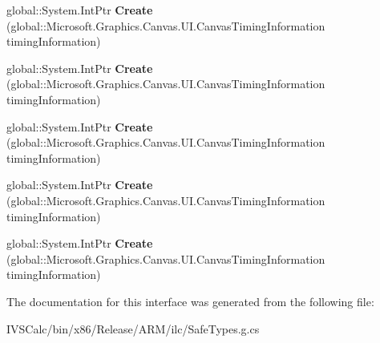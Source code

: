 \begin{DoxyCompactItemize}
\item 
\mbox{\label{interface_microsoft_1_1_graphics_1_1_canvas_1_1_u_i_1_1_xaml_1_1_i_canvas_animated_update_event_args_factory_a43b7b345f4a3e1e7a710d119ac5c47ae}} 
global\+::\+System.\+Int\+Ptr {\bfseries Create} (global\+::\+Microsoft.\+Graphics.\+Canvas.\+U\+I.\+Canvas\+Timing\+Information timing\+Information)
\item 
\mbox{\label{interface_microsoft_1_1_graphics_1_1_canvas_1_1_u_i_1_1_xaml_1_1_i_canvas_animated_update_event_args_factory_a43b7b345f4a3e1e7a710d119ac5c47ae}} 
global\+::\+System.\+Int\+Ptr {\bfseries Create} (global\+::\+Microsoft.\+Graphics.\+Canvas.\+U\+I.\+Canvas\+Timing\+Information timing\+Information)
\item 
\mbox{\label{interface_microsoft_1_1_graphics_1_1_canvas_1_1_u_i_1_1_xaml_1_1_i_canvas_animated_update_event_args_factory_a43b7b345f4a3e1e7a710d119ac5c47ae}} 
global\+::\+System.\+Int\+Ptr {\bfseries Create} (global\+::\+Microsoft.\+Graphics.\+Canvas.\+U\+I.\+Canvas\+Timing\+Information timing\+Information)
\item 
\mbox{\label{interface_microsoft_1_1_graphics_1_1_canvas_1_1_u_i_1_1_xaml_1_1_i_canvas_animated_update_event_args_factory_a43b7b345f4a3e1e7a710d119ac5c47ae}} 
global\+::\+System.\+Int\+Ptr {\bfseries Create} (global\+::\+Microsoft.\+Graphics.\+Canvas.\+U\+I.\+Canvas\+Timing\+Information timing\+Information)
\item 
\mbox{\label{interface_microsoft_1_1_graphics_1_1_canvas_1_1_u_i_1_1_xaml_1_1_i_canvas_animated_update_event_args_factory_a43b7b345f4a3e1e7a710d119ac5c47ae}} 
global\+::\+System.\+Int\+Ptr {\bfseries Create} (global\+::\+Microsoft.\+Graphics.\+Canvas.\+U\+I.\+Canvas\+Timing\+Information timing\+Information)
\end{DoxyCompactItemize}


The documentation for this interface was generated from the following file\+:\begin{DoxyCompactItemize}
\item 
I\+V\+S\+Calc/bin/x86/\+Release/\+A\+R\+M/ilc/Safe\+Types.\+g.\+cs\end{DoxyCompactItemize}

